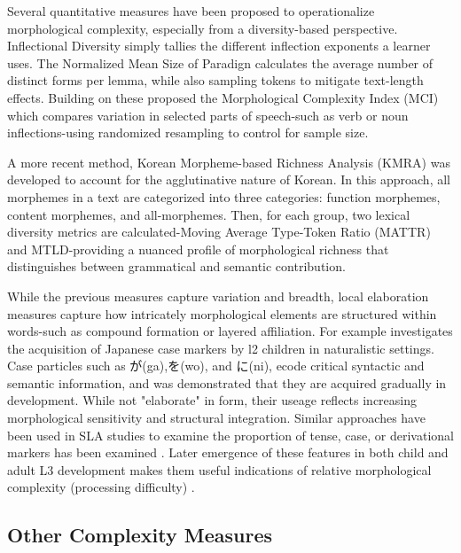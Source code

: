 Several quantitative measures have been proposed to operationalize morphological complexity, especially
from a diversity-based perspective. Inflectional Diversity
\citep{Malvern2004} simply tallies the
different inflection exponents a learner uses. The Normalized Mean Size of Paradign \citep{Xanthos2010} calculates
the average number of distinct forms per lemma, while also sampling tokens to mitigate text-length effects. Building
on these \cite{Brezina2019} proposed the Morphological Complexity Index (MCI) which compares variation in selected
parts of
speech-such as verb or noun
inflections-using
randomized resampling to control for sample size.

A more recent method, Korean Morpheme-based Richness Analysis (KMRA)
\citep{Hwang2024} was developed to account for the agglutinative nature of Korean. In this approach, all morphemes in
a text are categorized into three categories: function morphemes, content morphemes, and all-morphemes. Then, for
each group, two lexical diversity metrics are calculated-Moving Average Type-Token Ratio (MATTR)\citep{Covington2010} and MTLD\citep{McCarthy2010}-providing
a nuanced profile of morphological richness that distinguishes between grammatical and semantic contribution.

While the previous measures capture variation and breadth, local elaboration measures capture how intricately
morphological elements are structured within words-such as compound formation or layered
affiliation. For example \cite{Nishikawa2023} investigates the acquisition of Japanese case markers by l2 children
in naturalistic settings. Case particles such as が(ga),を(wo), and に(ni), ecode critical syntactic and semantic
information, and was demonstrated that they are acquired gradually in development. While not "elaborate" in form,
their useage reflects increasing morphological sensitivity and structural integration. Similar approaches have been
used in SLA studies to examine the proportion of tense, case, or derivational markers has been
examined
\citep{Verspoor2012,Guo2013, reynolds2016-insights,DeClercq2019}. Later emergence of these features in both child
and adult L3 development makes them useful indications of relative morphological complexity (processing difficulty)
\citep{Butle2012}.

\subsection{Other Complexity Measures}


